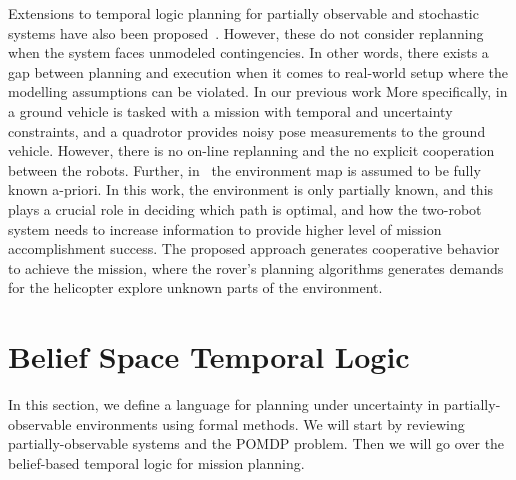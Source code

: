 \documentclass[letterpaper]{article} %
\newcommand{\cristi}[1]{{\color{orange} [Cristi] #1}}
\begin{document}
	
	
	
	
	Extensions to temporal logic planning for partially observable and stochastic systems have also been
	proposed~\cite{Cristi-CDC-2016,dorsa-rss2016,fu2015integrating}.
	However, these do not consider replanning when the system faces unmodeled contingencies.
	In other words, there exists a gap between planning and execution when it comes to real-world setup
	where the modelling assumptions can be violated.
	In our previous work
	More specifically, in \cite{Cristi-CDC-2016} a ground vehicle is tasked with
	a mission with temporal and uncertainty constraints, and a quadrotor provides noisy pose measurements to the ground vehicle.
	However, there is no on-line replanning and the no explicit cooperation between the robots.
	Further, in~\cite{Cristi-CDC-2016} the environment map is assumed to be fully known a-priori.
	In this work, the environment is only partially known, and this plays a crucial role in
	deciding which path is optimal, and how the two-robot system needs to increase information to
	provide higher level of mission accomplishment success.
	The proposed approach generates cooperative behavior to achieve the mission, where the rover's planning
	algorithms generates demands for the helicopter explore unknown parts of the environment.

	
	\section{Belief Space Temporal Logic}
	\label{sec:POMDP}
	In this section, we define a language for planning under uncertainty in partially-observable environments using formal methods. We will start by reviewing partially-observable systems and the POMDP problem. Then we will go over the belief-based temporal logic for mission planning.
	
\end{document}
